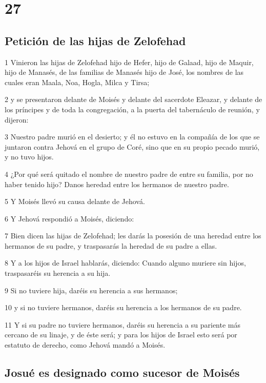 \chapter{27}

\section*{Petición de las hijas de Zelofehad}

\par 1 Vinieron las hijas de Zelofehad hijo de Hefer, hijo de Galaad, hijo de Maquir, hijo de Manasés, de las familias de Manasés hijo de José, los nombres de las cuales eran Maala, Noa, Hogla, Milca y Tirsa;
\par 2 y se presentaron delante de Moisés y delante del sacerdote Eleazar, y delante de los príncipes y de toda la congregación, a la puerta del tabernáculo de reunión, y dijeron:
\par 3 Nuestro padre murió en el desierto; y él no estuvo en la compañía de los que se juntaron contra Jehová en el grupo de Coré, sino que en su propio pecado murió, y no tuvo hijos.
\par 4 ¿Por qué será quitado el nombre de nuestro padre de entre su familia, por no haber tenido hijo? Danos heredad entre los hermanos de nuestro padre.
\par 5 Y Moisés llevó su causa delante de Jehová.
\par 6 Y Jehová respondió a Moisés, diciendo:
\par 7 Bien dicen las hijas de Zelofehad; les darás la posesión de una heredad entre los hermanos de su padre, y traspasarás la heredad de su padre a ellas.
\par 8 Y a los hijos de Israel hablarás, diciendo: Cuando alguno muriere sin hijos, traspasaréis su herencia a su hija.
\par 9 Si no tuviere hija, daréis su herencia a sus hermanos;
\par 10 y si no tuviere hermanos, daréis su herencia a los hermanos de su padre.
\par 11 Y si su padre no tuviere hermanos, daréis su herencia a su pariente más cercano de su linaje, y de éste será; y para los hijos de Israel esto será por estatuto de derecho, como Jehová mandó a Moisés.

\section*{Josué es designado como sucesor de Moisés}

